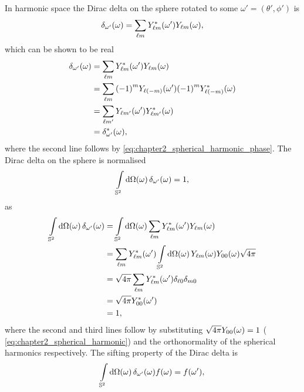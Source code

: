 In harmonic space the Dirac delta on the sphere rotated to some \(\omega'=(\theta',\phi')\) is
%
\begin{equation}
    \pixel{\delta_{\omega'}}
    = \harmonicSum \pixel[']{\conj{\harmonic{Y}}} \pixel{\harmonic{Y}},
\end{equation}
%
which can be shown to be real
%
\begin{align}\label{eq:chapter3_dirac_delta_real}
    \pixel{\delta_{\omega'}}
     & = \harmonicSum \pixel[']{\conj{\harmonic{Y}}} \pixel{\harmonic{Y}} \nonumber{}                           \\
     & = \harmonicSum \phaseFactor \pixel[']{Y_{\ell(-m)}} \phaseFactor \pixel{\conj{Y_{\ell(-m)}}} \nonumber{} \\
     & = \sum\limits_{\ell m'} \pixel[']{Y_{\ell m'}} \pixel{\conj{Y_{\ell m'}}} \nonumber{}                    \\
     & = \pixel{\conj{\delta_{\omega'}}},
\end{align}
%
where the second line follows by \cref{eq:chapter2_spherical_harmonic_phase}.
The Dirac delta on the sphere is normalised
%
\begin{equation}
    \integrateSphere{\omega} \pixel{\delta_{\omega'}}
    = 1,
\end{equation}
%
as
%
\begin{align}
    \integrateSphere{\omega} \pixel{\delta_{\omega'}}
     & = \integrateSphere{\omega} \harmonicSum \pixel[']{\conj{\harmonic{Y}}} \pixel{\harmonic{Y}} \nonumber{}                            \\
     & = \harmonicSum \pixel[']{\conj{\harmonic{Y}}} \integrateSphere{\omega} \pixel{\harmonic{Y}} \pixel{Y_{00}} \sqrt{4\pi} \nonumber{} \\
     & = \sqrt{4\pi} \harmonicSum \pixel[']{\conj{\harmonic{Y}}} \delta_{\ell0} \delta_{m0} \nonumber{}                                   \\
     & = \sqrt{4\pi} \pixel[']{\conj{Y_{00}}} \nonumber{}                                                                                 \\
     & = 1,
\end{align}
%
where the second and third lines follow by substituting \(\sqrt{4\pi}\pixel{Y_{00}}=1\) (\cf{} \cref{eq:chapter2_spherical_harmonic}) and the orthonormality of the spherical harmonics respectively.
The sifting property of the Dirac delta is
%
\begin{equation}
    \integrateSphere{\omega} \pixel{\delta_{\omega'}} \pixel{f}
    = \pixel[']{f},
\end{equation}
